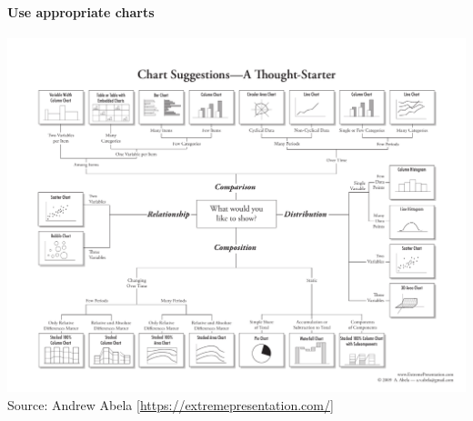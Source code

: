 \documentclass[8pt]{beamer}
\begin{document}

\begin{frame}
\frametitle{\insertsection}
\framesubtitle{Use appropriate charts}

\centering
\includegraphics[width=0.85\linewidth]{chart_selection}\\
\tiny{Source: Andrew Abela [\url{https://extremepresentation.com/}]}

\end{frame}

\end{document}

